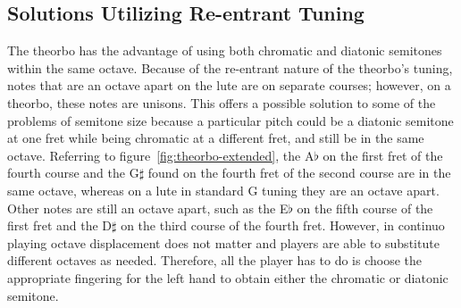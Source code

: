 \subsection{Solutions Utilizing Re-entrant Tuning}

The theorbo has the advantage of using both chromatic and diatonic semitones within
the same octave.  Because of the re-entrant nature of the theorbo's tuning, notes that
are an octave apart on the lute are on separate courses; however, on a theorbo, these
notes are unisons. This offers a possible solution to some of the problems of semitone
size because a particular pitch could be a diatonic semitone at one fret while being
chromatic at a different fret, and still be in the same octave. Referring to
figure~\ref{fig:theorbo-extended}, the A$\flat$ on the first fret of the fourth course
and the G$\sharp$ found on the fourth fret of the second course are in the same octave,
whereas on a lute in standard G tuning they are an octave apart. Other notes are still
an octave apart, such as the E$\flat$ on the fifth course of the first fret and the
D$\sharp$ on the third course of the fourth fret.  However, in continuo playing octave
displacement does not matter and players are able to substitute different
octaves as needed. Therefore, all the player has to do is choose the appropriate
fingering for the left hand to obtain either the chromatic or diatonic semitone.

